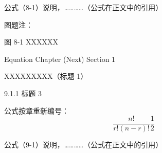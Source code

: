 \documentclass[UTF8, scheme=chinese, openany, oneside]{ctexbook}
\begin{document}
\vspace{1.8cm}
\noindent \hspace{2em} 公式（8-1）说明，…………（公式在正文中的引用）
\vspace{3.5cm}

\noindent \hspace{2em} 图题注：

\vspace{0.8cm}

\begin{center}
     图 8-1 \quad XXXXXX
\end{center}

\newpage
{}
\vspace*{5cm}
\begin{center}
{\color{white} Equation Chapter (Next) Section 1}
\end{center}


\clearpage
\setcounter{chapter}{8}
\setcounter{page}{19}


\vspace{1cm}
\begin{center}
{ \quad XXXXXXXXX（标题 1）}
\end{center}
\vspace{0.8cm}


\vspace{0.3cm}
\noindent \hspace{2em} { 9.1.1 \quad 标题 3}

\vspace{1.2cm}
\noindent \hspace{2em} 公式按章重新编号：
\vspace{0.6cm}
\begin{equation}
\frac{n!}{r!(n-r)!} \frac{1}{2} \tag{9-1} \label{eq:9-1}
\end{equation}

\vspace{1.8cm}
\noindent \hspace{2em} 公式（9-1）说明，…………（公式在正文中的引用）
\vspace{3.5cm}
\end{document}
